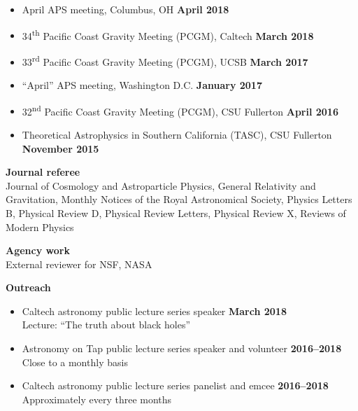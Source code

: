 \documentclass[margin,line]{res}
\begin{document}
\begin{resume}
\begin{itemize}
\item[]
April APS meeting, Columbus, OH
\hfill {\bf April 2018}
\item[]
34\textsuperscript{th} Pacific Coast Gravity Meeting (PCGM),
Caltech
\hfill {\bf March 2018}
\item[]
33\textsuperscript{rd} Pacific Coast Gravity Meeting (PCGM),
UCSB
\hfill {\bf March 2017}
\item[]
``April'' APS meeting, Washington D.C.
\hfill {\bf January 2017}
\item[]
32\textsuperscript{nd} Pacific Coast Gravity Meeting (PCGM),
CSU Fullerton
\hfill {\bf April 2016}
\item[]
Theoretical Astrophysics in Southern California (TASC),
CSU Fullerton
\hfill {\bf November 2015}
\end{itemize}

{\bf Journal referee}
\vspace*{.05in}\\
\hspace*{1em}
Journal of Cosmology and Astroparticle Physics,
General Relativity and Gravitation,
Monthly Notices of the Royal Astronomical Society,
Physics Letters B,
Physical Review D,
Physical Review Letters,
Physical Review X,
Reviews of Modern Physics

{\bf Agency work}
\vspace*{.05in}\\
\hspace*{1em}
External reviewer for NSF, NASA

{\bf Outreach}
\vspace*{.05in}
\begin{itemize}
\item[] Caltech astronomy public lecture series speaker
  \hfill {\bf March 2018} \\
  \hspace*{1em} Lecture: ``The truth about black holes''

\item[] Astronomy on Tap public lecture series speaker and volunteer
  \hfill {\bf 2016--2018} \\
\hspace*{1em} Close to a monthly basis

\item[] Caltech astronomy public lecture series panelist and emcee
        \hfill {\bf 2016--2018} \\
\hspace*{1em} Approximately every three months \\


\end{itemize}
\end{resume}
\end{document}
